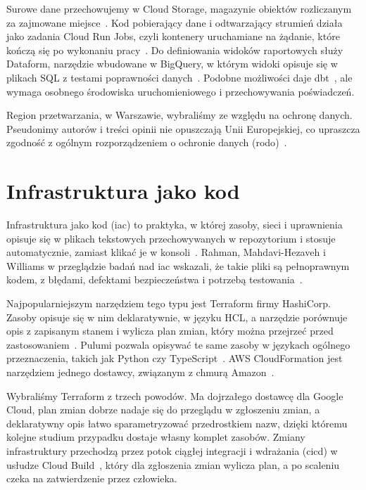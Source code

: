 Surowe dane przechowujemy w Cloud Storage, magazynie obiektów rozliczanym za zajmowane miejsce~\cite{doccloudstorage}.
Kod pobierający dane i odtwarzający strumień działa jako zadania Cloud Run Jobs, czyli kontenery uruchamiane na żądanie, które kończą się po wykonaniu pracy~\cite{doccloudrunjobs}.
Do definiowania widoków raportowych służy Dataform, narzędzie wbudowane w BigQuery, w którym widoki opisuje się w plikach SQL z testami poprawności danych~\cite{docdataform}.
Podobne możliwości daje dbt~\cite{docdbt}, ale wymaga osobnego środowiska uruchomieniowego i przechowywania poświadczeń.

Region przetwarzania,  w Warszawie, wybraliśmy ze względu na ochronę danych.
Pseudonimy autorów i treści opinii nie opuszczają Unii Europejskiej, co upraszcza zgodność z ogólnym rozporządzeniem o ochronie danych (\ac{rodo})~\cite{rodo2016}.

\section{Infrastruktura jako kod}
\label{sec:tech-iac}

Infrastruktura jako kod (\ac{iac}) to praktyka, w której zasoby, sieci i uprawnienia opisuje się w plikach tekstowych przechowywanych w repozytorium i stosuje automatycznie, zamiast klikać je w konsoli~\cite{morris2021infrastructure}.
Rahman, Mahdavi-Hezaveh i Williams w przeglądzie badań nad \ac{iac} wskazali, że takie pliki są pełnoprawnym kodem, z błędami, defektami bezpieczeństwa i potrzebą testowania~\cite{rahman2019systematic}.

Najpopularniejszym narzędziem tego typu jest Terraform firmy HashiCorp.
Zasoby opisuje się w nim deklaratywnie, w języku HCL, a narzędzie porównuje opis z zapisanym stanem i wylicza plan zmian, który można przejrzeć przed zastosowaniem~\cite{docterraform,brikman2022terraform}.
Pulumi pozwala opisywać te same zasoby w językach ogólnego przeznaczenia, takich jak Python czy TypeScript~\cite{docpulumi}.
AWS CloudFormation jest narzędziem jednego dostawcy, związanym z chmurą Amazon~\cite{doccloudformation}.

Wybraliśmy Terraform z trzech powodów.
Ma dojrzałego dostawcę dla Google Cloud, plan zmian dobrze nadaje się do przeglądu w zgłoszeniu zmian, a deklaratywny opis łatwo sparametryzować przedrostkiem nazw, dzięki któremu kolejne studium przypadku dostaje własny komplet zasobów.
Zmiany infrastruktury przechodzą przez potok ciągłej integracji i wdrażania (\ac{cicd}) w usłudze Cloud Build~\cite{doccloudbuild}, który dla zgłoszenia zmian wylicza plan, a po scaleniu czeka na zatwierdzenie przez człowieka.

